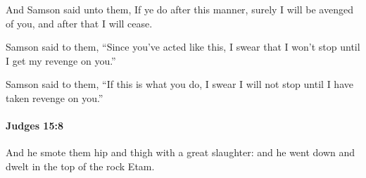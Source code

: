 			\begin{versebox}
					\item[BHS] 
					\item[ASV] And Samson said unto them, If ye do after this manner, surely I will be avenged of you, and after that I will cease.
					\item[NIV] Samson said to them, “Since you’ve acted like this, I swear that I won’t stop until I get my revenge on you.”
					\item[NRSV] Samson said to them, “If this is what you do, I swear I will not stop until I have taken revenge on you.”
			\end{versebox}

		\paragraph{Judges 15:8} %
			\label{JUDGES-15-8}

			And he smote them hip and thigh with a great slaughter: and he went down and dwelt in the top of the rock Etam.

